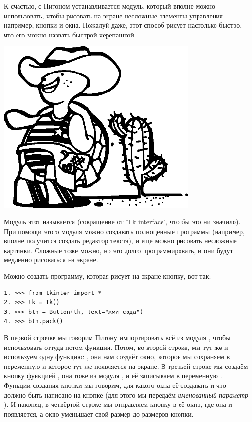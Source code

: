 К счастью, с Питоном устанавливается модуль, который вполне можно использовать, чтобы рисовать на экране несложные элементы управления — например, кнопки и окна. Пожалуй даже, этот способ рисует настолько быстро, что его можно назвать быстрой черепашкой.

\begin{center}
\includegraphics*[width=100mm]{../en/turtle2.eps}
\end{center}

Модуль этот называется  (сокращение от 'Tk interface', что бы это ни значило). При помощи этого модуля можно создавать полноценные программы (например, вполне получится создать редактор текста), и ещё можно рисовать несложные картинки. Сложные тоже можно, но это долго программировать, и они будут медленно рисоваться на экране.

Можно создать программу, которая рисует на экране кнопку, вот так:

\begin{listing}
\begin{verbatim}
1. >>> from tkinter import *
2. >>> tk = Tk()
3. >>> btn = Button(tk, text="жми сюда")
4. >>> btn.pack()
\end{verbatim}
\end{listing}

В первой строчке мы говорим Питону импортировать всё из модуля , чтобы использовать оттуда потом функции. Потом, во второй строке, мы тут же и используем одну функцию: , она нам создаёт окно, которое мы сохраняем в переменную  и которое тут же появляется на экране. В третьей строке мы создаём кнопку функцией , она тоже из модуля , и её записываем в переменную . Функции создания кнопки мы говорим, для какого окна её создавать и что должно быть написано на кнопке (для этого мы передаём \emph{именованный параметр} ). И наконец, в четвёртой строке мы отправляем кнопку в её окно, где она и появляется, а окно уменьшает свой размер до размеров кнопки.

